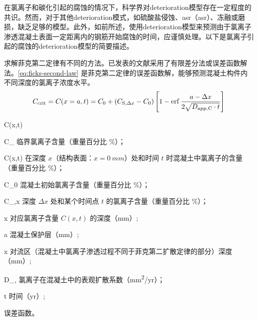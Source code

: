 在氯离子和碳化引起的腐蚀的情况下，科学界对\gls*{deterioration}模型存在一定程度的共识。然而，对于其他\gls*{deterioration}模式，如硫酸盐侵蚀、\acrlong{asr}（\acrshort{asr}）、冻融或磨损，缺乏足够的模型。此外，如前所述，使用\gls*{deterioration}模型来预测由于氯离子渗透混凝土表面一定距离内的钢筋开始腐蚀的时间，应谨慎处理。以下是氯离子引起的腐蚀的\gls*{deterioration}模型的简要描述。


求解菲克第二定律有不同的方法。已发表的文献采用了有限差分法或误差函数解法。\cref{eq:ficks-second-law} 是菲克第二定律的误差函数解，能够预测混凝土构件内不同深度的氯离子浓度水平。
\begin{equation}
  \label{eq:ficks-second-law}
  C_\text{crit} = C(x=a, t) = C_0 +(C_{\text{S},\Delta x} - C_0)\left[ 1-\operatorname{erf} 
   \frac{a-\Delta x}{2\sqrt{D_{\text{app},\text{C}}\cdot t}} \right]
\end{equation}
\begin{EqDesc}{C(x,t)}
  \item[C_\text{crit}] 临界氯离子含量（重量百分比 \%）；
  \item[C(x,t)] 在深度 $x$（结构表面：$x=\qty{0}{mm}$）处和时间 $t$ 时混凝土中氯离子的含量（重量百分比 \%）；
  \item[C_0] 混凝土初始氯离子含量（重量百分比 \%）；
  \item[C_{\text{S},\Delta x}] 深度 $\Delta x$ 处和某个时间点 $t$ 的氯离子含量（重量百分比 \%）；
  \item[x] 对应氯离子含量 $C(x,t)$ 的深度（\unit{mm}）;
  \item[a] 混凝土保护层（\unit{mm}）;
  \item[\Delta x]对流区（混凝土中氯离子渗透过程不同于菲克第二扩散定律的部分）深度（\unit{mm}）;
  \item[D_{\text{app},\text{C}}] 氯离子在混凝土中的表观扩散系数（\unit{mm^2/yr}）；
  \item[t] 时间（\unit{yr}）;
  \item[\erf] 误差函数。
\end{EqDesc}


